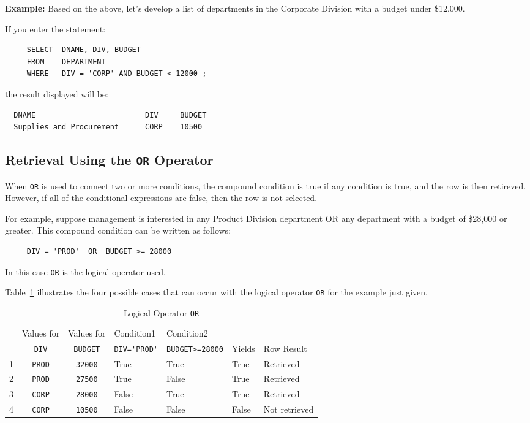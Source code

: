 {\bf Example:}
Based on the above, let's develop a list of departments in the
Corporate Division with a budget under \$12,000.

If you enter the statement:
\begin{verbatim}
     SELECT  DNAME, DIV, BUDGET
     FROM    DEPARTMENT
     WHERE   DIV = 'CORP' AND BUDGET < 12000 ;
\end{verbatim}
the result displayed will be:

\begin{screen}
\begin{verbatim}
  DNAME                         DIV     BUDGET
  Supplies and Procurement      CORP    10500
\end{verbatim}
\end{screen}

\subsection{Retrieval Using the {\tt OR} Operator}

When {\tt OR} is used to connect two or more conditions, the compound
condition is true if any condition is true, and the row is then
retireved.  However, if all of the conditional expressions are false,
then the row is not selected.

For example, suppose management is interested in any Product Division
department OR any department with a budget of \$28,000 or greater.
This compound condition can be written as follows:
\begin{verbatim}
     DIV = 'PROD'  OR  BUDGET >= 28000
\end{verbatim}
In this case {\tt OR} is the logical operator used.

Table~\ref{tab:LogOr} illustrates the four possible cases that can
occur with the logical operator {\tt OR} for the example just given.

\begin{table}
\caption{Logical Operator {\tt OR}}{\label{tab:LogOr}}
\begin{center}
\begin{tabular}{|lccllll|} \hline
  & Values for  & Values for    & Condition1        & Condition2          &        &               \\
  & \verb`DIV`  & \verb`BUDGET` & \verb`DIV='PROD'` & \verb`BUDGET>=28000` & Yields & Row Result    \\ \hline\hline
1 & \verb`PROD` & \verb`32000`  & True              & True                & True   & Retrieved     \\
2 & \verb`PROD` & \verb`27500`  & True              & False               & True   & Retrieved     \\
3 & \verb`CORP` & \verb`28000`  & False             & True                & True   & Retrieved     \\
4 & \verb`CORP` & \verb`10500`  & False             & False               & False  & Not retrieved \\ \hline
\end{tabular}
\end{center}
\end{table}

